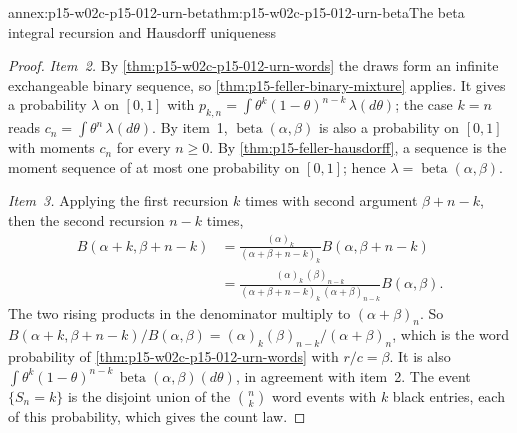 \begin{annexitem}{annex:p15-w02c-p15-012-urn-beta}{thm:p15-w02c-p15-012-urn-beta}{The beta integral recursion and Hausdorff uniqueness}
\begin{proof}
\emph{Item~2.} By \cref{thm:p15-w02c-p15-012-urn-words} the draws form an
infinite exchangeable binary sequence, so
\cref{thm:p15-feller-binary-mixture} applies. It gives a probability
\(\lambda\) on \([0,1]\) with
\(p_{k,n}=\int\theta^k(1-\theta)^{n-k}\,\lambda(d\theta)\); the case
\(k=n\) reads \(c_n=\int\theta^n\,\lambda(d\theta)\). By item~1,
\(\operatorname{beta}(\alpha,\beta)\) is also a probability on \([0,1]\)
with moments \(c_n\) for every \(n\geq0\). By \cref{thm:p15-feller-hausdorff},
a sequence is the moment sequence of at most one probability on \([0,1]\);
hence \(\lambda=\operatorname{beta}(\alpha,\beta)\).

\emph{Item~3.} Applying the first recursion \(k\) times with second
argument \(\beta+n-k\), then the second recursion \(n-k\) times,
\begin{align*}
 B(\alpha+k,\beta+n-k)
   &=\frac{(\alpha)_k}{(\alpha+\beta+n-k)_k}B(\alpha,\beta+n-k)\\
   &=\frac{(\alpha)_k\,(\beta)_{n-k}}
         {(\alpha+\beta+n-k)_k\,(\alpha+\beta)_{n-k}}B(\alpha,\beta).
\end{align*}
The two rising products in the denominator multiply to
\((\alpha+\beta)_n\). So
\(B(\alpha+k,\beta+n-k)/B(\alpha,\beta)=(\alpha)_k(\beta)_{n-k}/(\alpha+\beta)_n\),
which is the word probability of \cref{thm:p15-w02c-p15-012-urn-words}
with \(r/c=\beta\). It is also
\(\int\theta^k(1-\theta)^{n-k}\,\operatorname{beta}(\alpha,\beta)(d\theta)\),
in agreement with item~2. The event \(\{S_n=k\}\) is the disjoint union
of the \(\binom nk\) word events with \(k\) black entries, each of this
probability, which gives the count law.
\end{proof}
\end{annexitem}

